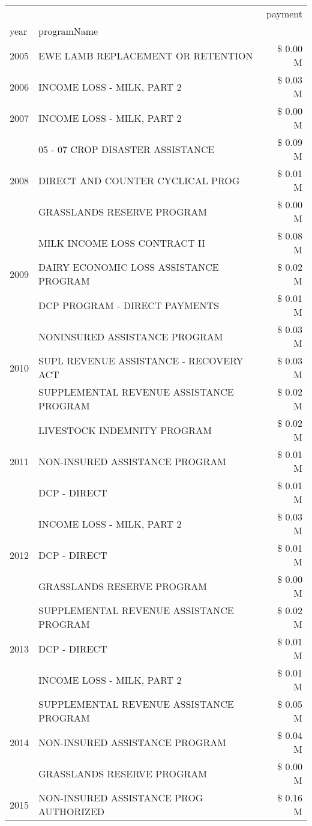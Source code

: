 \begin{tabular}{llr}
\toprule
 &  & payment \\
year & programName &  \\
\midrule
2005 & EWE LAMB REPLACEMENT OR RETENTION & \$ 0.00 M \\
\cline{1-3}
2006 & INCOME LOSS - MILK, PART 2 & \$ 0.03 M \\
\cline{1-3}
2007 & INCOME LOSS - MILK, PART 2 & \$ 0.00 M \\
\cline{1-3}
\multirow[t]{3}{*}{2008} & 05 - 07 CROP DISASTER ASSISTANCE & \$ 0.09 M \\
 & DIRECT AND COUNTER CYCLICAL PROG & \$ 0.01 M \\
 & GRASSLANDS RESERVE PROGRAM & \$ 0.00 M \\
\cline{1-3}
\multirow[t]{3}{*}{2009} & MILK INCOME LOSS CONTRACT II & \$ 0.08 M \\
 & DAIRY ECONOMIC LOSS ASSISTANCE PROGRAM & \$ 0.02 M \\
 & DCP PROGRAM - DIRECT PAYMENTS & \$ 0.01 M \\
\cline{1-3}
\multirow[t]{3}{*}{2010} & NONINSURED ASSISTANCE PROGRAM & \$ 0.03 M \\
 & SUPL REVENUE ASSISTANCE - RECOVERY ACT & \$ 0.03 M \\
 & SUPPLEMENTAL REVENUE ASSISTANCE PROGRAM & \$ 0.02 M \\
\cline{1-3}
\multirow[t]{3}{*}{2011} & LIVESTOCK INDEMNITY PROGRAM & \$ 0.02 M \\
 & NON-INSURED ASSISTANCE PROGRAM & \$ 0.01 M \\
 & DCP - DIRECT & \$ 0.01 M \\
\cline{1-3}
\multirow[t]{3}{*}{2012} & INCOME LOSS - MILK, PART 2 & \$ 0.03 M \\
 & DCP - DIRECT & \$ 0.01 M \\
 & GRASSLANDS RESERVE PROGRAM & \$ 0.00 M \\
\cline{1-3}
\multirow[t]{3}{*}{2013} & SUPPLEMENTAL REVENUE ASSISTANCE PROGRAM & \$ 0.02 M \\
 & DCP - DIRECT & \$ 0.01 M \\
 & INCOME LOSS - MILK, PART 2 & \$ 0.01 M \\
\cline{1-3}
\multirow[t]{3}{*}{2014} & SUPPLEMENTAL REVENUE ASSISTANCE PROGRAM & \$ 0.05 M \\
 & NON-INSURED ASSISTANCE PROGRAM & \$ 0.04 M \\
 & GRASSLANDS RESERVE PROGRAM & \$ 0.00 M \\
\cline{1-3}
\multirow[t]{3}{*}{2015} & NON-INSURED ASSISTANCE PROG AUTHORIZED & \$ 0.16 M \\

\end{tabular}
